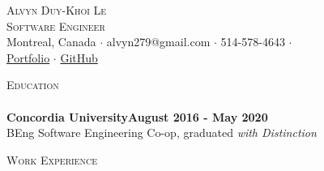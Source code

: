 \documentclass[a4paper]{article}
\newcommand{\lineunder} {
    \vspace*{-8pt} \\
    \hspace*{-18pt} \hrulefill \\
}
\newcommand{\header} [1] {
    {\hspace*{-18pt}\vspace*{6pt} \textsc{#1}}
    \vspace*{-6pt} \lineunder
}
\begin{document}
\vspace*{-40pt}

    

\vspace*{-13pt}
\begin{center}
	{\Large \scshape {Alvyn Duy-Khoi Le}}\\
	{\vspace*{3pt}}
	{\large \scshape {Software Engineer}}\\
	{\vspace*{3pt}}
	{\footnotesize Montreal, Canada $\cdot$ alvyn279@gmail.com $\cdot$ 514-578-4643 $\cdot$}\\
	{\footnotesize \href{https://alvynle.me}{Portfolio}  $\cdot$ \href{https://github.com/alvyn279}{GitHub}}\\
\end{center}

\header{Education}
\textbf{Concordia University}\hfill \textbf{August 2016 - May 2020}\\
BEng Software Engineering Co-op, graduated \textit{with Distinction}\\ 
\vspace{3mm}

\header{Work Experience}
\vspace{1mm}
\end{document}
